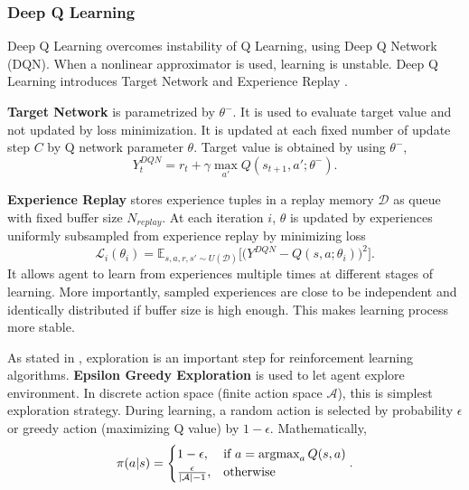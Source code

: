 \subsubsection{Deep Q Learning}
Deep Q Learning overcomes instability of Q Learning, using Deep Q Network (DQN). 
When a nonlinear approximator is used, learning is unstable. 
Deep Q Learning introduces Target Network and Experience Replay \cite{mnih_human-level_2015, mnih_playing_2013}. 

\textbf{Target Network} is parametrized by $\theta^-$. 
It is used to evaluate target value and not updated by loss minimization. 
It is updated at each fixed number of update step $C$ by Q network parameter $\theta$. 
Target value is obtained by using $\theta^-$, 
\begin{equation}
\label{eqn:dqn_ntarget}
Y_t^{DQN} = r_t + \gamma \max_{a'} Q(s_{t+1},a';\theta^-).
\end{equation}

\textbf{Experience Replay} stores experience tuples in a replay memory $\mathcal{D}$ as queue with fixed buffer size $N_{replay}$. 
At each iteration $i$, $\theta$ is updated by experiences uniformly subsampled from experience replay by minimizing loss
\begin{equation}
\label{eqn:dqn_loss}
\mathcal{L}_i(\theta_i) = \mathbb{E}_{s,a,r,s'\sim U(\mathcal{D})}\Big[\big( Y^{DQN} - Q(s,a;\theta_i) \big) ^ 2 \Big].
\end{equation}
It allows agent to learn from experiences multiple times at different stages of learning. More importantly, sampled experiences are close to be independent and identically distributed if buffer size is high enough. 
This makes learning process more stable. 

As stated in , exploration is an important step for reinforcement learning algorithms. 
\textbf{Epsilon Greedy Exploration} is used to let agent explore environment. 
In discrete action space (finite action space $\mathcal{A}$), this is 
simplest exploration strategy.
During learning, a random action is selected by probability $\epsilon$ or greedy action (maximizing Q value) by $1-\epsilon$. Mathematically,  
\begin{equation}
\label{eqn:egreedy_policy}
\pi(a|s) = 
\begin{cases}
1-\epsilon,   & \text{if } a = \operatorname{\textup{argmax}}_{a} Q(s, a)\\
\frac{\epsilon}{|\mathcal{A}|-1},     & \text{otherwise}
\end{cases}.
\end{equation}

